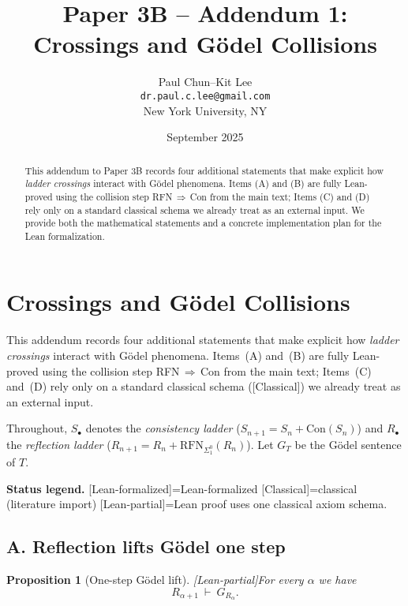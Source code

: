 \documentclass[11pt]{article}
\title{Paper 3B -- Addendum 1:\\
Crossings and Gödel Collisions}
\author{Paul Chun--Kit Lee\\
\texttt{dr.paul.c.lee@gmail.com}\\
New York University, NY}
\date{September 2025}
\newtheorem{proposition}[theorem]{Proposition}
\newcommand{\Con}{\mathrm{Con}}
\newcommand{\RFNSigOne}{\mathrm{RFN}_{\Sigma^0_1}}
\newcommand{\leanok}{\textsf{\textcolor{green!70!black}{[Lean-formalized]}}}
\newcommand{\leancited}{\textsf{\textcolor{blue!70!black}{[Classical]}}}
\newcommand{\leanpartial}{\textsf{\textcolor{violet!70!black}{[Lean-partial]}}}
\begin{document}
\maketitle

\begin{abstract}
This addendum to Paper 3B records four additional statements that make explicit how \emph{ladder crossings} interact with Gödel phenomena. Items (A) and (B) are fully Lean-proved using the collision step RFN\,$\Rightarrow$\,Con from the main text; Items (C) and (D) rely only on a standard classical schema we already treat as an external input. We provide both the mathematical statements and a concrete implementation plan for the Lean formalization.
\end{abstract}


\section{Crossings and Gödel Collisions}\label{sec:crossing-godel}

This addendum records four additional statements that make explicit how
\emph{ladder crossings} interact with Gödel phenomena. Items~(A) and~(B)
are fully Lean-proved using the collision step RFN\,$\Rightarrow$\,Con
from the main text; Items~(C) and~(D) rely only on a standard classical
schema (\leancited) we already treat as an external input.

Throughout, $S_\bullet$ denotes the \emph{consistency ladder}
($S_{n+1}=S_n+\Con(S_n)$) and $R_\bullet$ the \emph{reflection ladder}
($R_{n+1}=R_n+\RFNSigOne(R_n)$). Let $G_T$ be the Gödel sentence of $T$.

\medskip
\noindent\textbf{Status legend.}
\leanok\;=\;Lean-formalized\quad
\leancited\;=\;classical (literature import)\quad
\leanpartial\;=\;Lean proof uses one classical axiom schema.

\subsection{A. Reflection lifts Gödel one step} 

\begin{proposition}[One-step Gödel lift]\label{prop:RFN-lifts-G}
\leanpartial\quad For every $\alpha$ we have
\[
  R_{\alpha+1}\ \vdash\ G_{R_\alpha}.
\]
\end{proposition}
\end{document}

